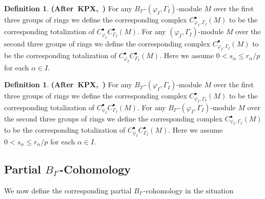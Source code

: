 \documentclass[12pt]{amsart}
\theoremstyle{definition}
\newtheorem{definition}[theorem]{Definition}
\numberwithin{equation}{section}
\begin{document}
\begin{definition} \mbox{\bf{(After KPX, \cite[Definition 2.3.3]{KPX})}}
For any $B_{I'}$-$(\varphi_I,\Gamma_I)$-module $M$ over 
the first three groups of rings 
we define the corresponding complex $C^\bullet_{\varphi_I,\Gamma_I}(M)$ to be the corresponding totalization of $C^\bullet_{\varphi_I}C^\bullet_{\Gamma_I}(M)$.
For any $(\varphi_I,\Gamma_I)$-module $M$ over 
the second three groups of rings
we define the corresponding complex $C^\bullet_{\varphi_I,\Gamma_I}(M)$ to be the corresponding totalization of $C^\bullet_{\varphi_I}C^\bullet_{\Gamma_I}(M)$. Here we assume $0< s_\alpha \leq r_\alpha/p$ for each $\alpha\in I$.	
	
\end{definition}







\begin{definition} \mbox{\bf{(After KPX, \cite[Definition 2.3.3]{KPX})}}
For any $B_{I'}$-$(\varphi_I,\Gamma_I)$-module $M$ over 
the first three groups of rings
we define the corresponding complex $C^\bullet_{\psi_I,\Gamma_I}(M)$ to be the corresponding totalization of $C^\bullet_{\psi_I}C^\bullet_{\Gamma_I}(M)$.
For any $B_{I'}$-$(\varphi_I,\Gamma_I)$-module $M$ over 
the second three groups of rings
we define the corresponding complex $C^\bullet_{\psi_I,\Gamma_I}(M)$ to be the corresponding totalization of $C^\bullet_{\psi_I}C^\bullet_{\Gamma_I}(M)$. Here we assume $0< s_\alpha \leq r_\alpha/p$ for each $\alpha\in I$.	
	
\end{definition}









\subsection{Partial $B_{I'}$-Cohomology}


\noindent We now define the corresponding partial $B_{I'}$-cohomology  in the situation 
\end{document}
